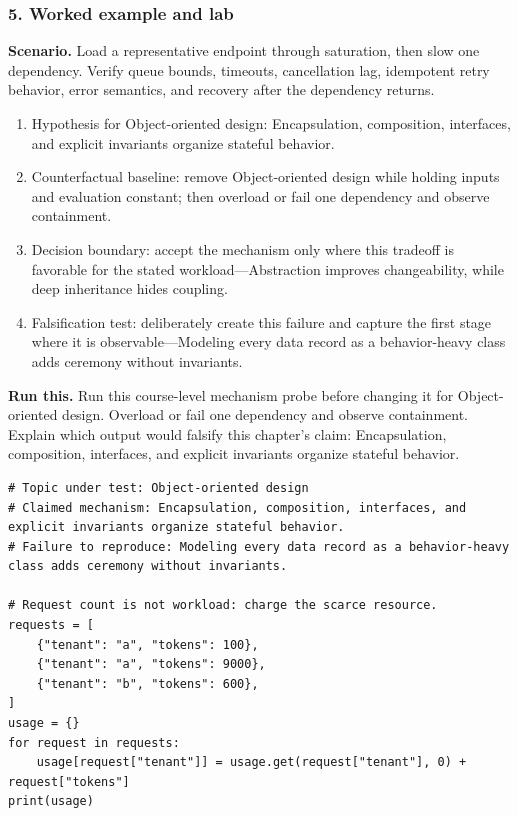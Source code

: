 \subsubsection*{5. Worked example and lab}
\textbf{Scenario.} Load a representative endpoint through saturation, then slow one dependency. Verify queue bounds, timeouts, cancellation lag, idempotent retry behavior, error semantics, and recovery after the dependency returns.
\begin{enumerate}
\item Hypothesis for Object-oriented design: Encapsulation, composition, interfaces, and explicit invariants organize stateful behavior.
\item Counterfactual baseline: remove Object-oriented design while holding inputs and evaluation constant; then overload or fail one dependency and observe containment.
\item Decision boundary: accept the mechanism only where this tradeoff is favorable for the stated workload—Abstraction improves changeability, while deep inheritance hides coupling.
\item Falsification test: deliberately create this failure and capture the first stage where it is observable—Modeling every data record as a behavior-heavy class adds ceremony without invariants.
\end{enumerate}
\textbf{Run this.} Run this course-level mechanism probe before changing it for Object-oriented design. Overload or fail one dependency and observe containment. Explain which output would falsify this chapter's claim: Encapsulation, composition, interfaces, and explicit invariants organize stateful behavior.
\begin{Verbatim}[fontsize=\scriptsize]
# Topic under test: Object-oriented design
# Claimed mechanism: Encapsulation, composition, interfaces, and explicit invariants organize stateful behavior.
# Failure to reproduce: Modeling every data record as a behavior-heavy class adds ceremony without invariants.

# Request count is not workload: charge the scarce resource.
requests = [
    {"tenant": "a", "tokens": 100},
    {"tenant": "a", "tokens": 9000},
    {"tenant": "b", "tokens": 600},
]
usage = {}
for request in requests:
    usage[request["tenant"]] = usage.get(request["tenant"], 0) + request["tokens"]
print(usage)
\end{Verbatim}
